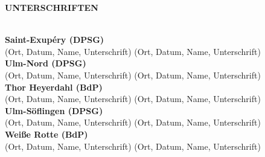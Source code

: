 \begin{Large}
    \textbf{UNTERSCHRIFTEN}
\end{Large}
\\

\textbf{Saint-Exupéry (DPSG)}
\\
(Ort, Datum, Name, Unterschrift) (Ort, Datum, Name, Unterschrift)
\\

\textbf{Ulm-Nord (DPSG)}
\\
(Ort, Datum, Name, Unterschrift) (Ort, Datum, Name, Unterschrift)
\\

\textbf{Thor Heyerdahl (BdP)}
\\
(Ort, Datum, Name, Unterschrift) (Ort, Datum, Name, Unterschrift)
\\

\textbf{Ulm-Söflingen (DPSG)}
\\
(Ort, Datum, Name, Unterschrift) (Ort, Datum, Name, Unterschrift)
\\

\textbf{Weiße Rotte (BdP)}
\\
(Ort, Datum, Name, Unterschrift) (Ort, Datum, Name, Unterschrift)
